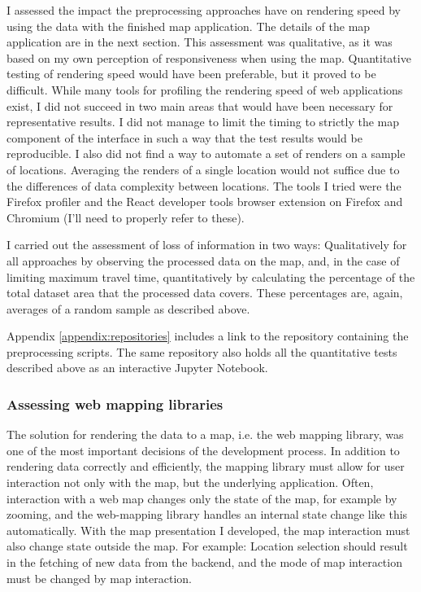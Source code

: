I assessed the impact the preprocessing approaches have on rendering speed
by using the data with the finished map application.
The details of the map application are in the next section.
This assessment was qualitative,
as it was based on my own perception of responsiveness when using the map.
Quantitative testing of rendering speed would have been preferable,
but it proved to be difficult.
While many tools for profiling the rendering speed of web applications exist,
I did not succeed in two main areas
that would have been necessary for representative results.
I did not manage to limit the timing to strictly the map
component of the interface in such a way that
the test results would be reproducible.
I also did not find a way to automate a set of renders
on a sample of locations.
Averaging the renders of a single location would not suffice
due to the differences of data complexity between locations.
The tools I tried were the Firefox profiler
and the React developer tools browser extension on Firefox and Chromium
(I'll need to properly refer to these).

I carried out the assessment of loss of information in two ways:
Qualitatively for all approaches by observing the processed data on the map,
and, in the case of limiting maximum travel time,
quantitatively by calculating the percentage of the total dataset area
that the processed data covers.
These percentages are, again, averages of a random sample as described above.

Appendix \ref{appendix:repositories} includes a link to the repository
containing the preprocessing scripts.
The same repository also holds all the quantitative tests described above
as an interactive Jupyter Notebook.

\subsubsection{Assessing web mapping libraries}

The solution for rendering the data to a map, i.e. the web mapping library,
was one of the most important decisions of the development process. 
In addition to rendering data correctly and efficiently,
the mapping library must allow for user interaction not only with the map,
but the underlying application.
Often, interaction with a web map changes only the state of the map,
for example by zooming,
and the web-mapping library handles an internal state change like this automatically.
With the map presentation I developed,
the map interaction must also change state outside the map.
For example:
Location selection should result in the fetching of new data from the backend,
and the mode of map interaction must be changed by map interaction.

